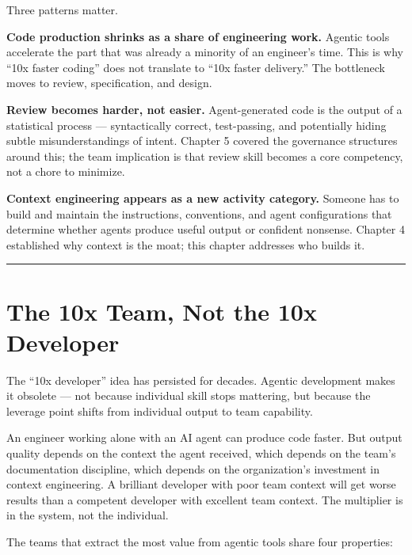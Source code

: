 \documentclass[
  a4paper,
  DIV=11,
  numbers=noendperiod]{scrreprt}
\begin{document}
Three patterns matter.

\textbf{Code production shrinks as a share of engineering work.} Agentic
tools accelerate the part that was already a minority of an engineer's
time. This is why ``10x faster coding'' does not translate to ``10x
faster delivery.'' The bottleneck moves to review, specification, and
design.

\textbf{Review becomes harder, not easier.} Agent-generated code is the
output of a statistical process --- syntactically correct, test-passing,
and potentially hiding subtle misunderstandings of intent. Chapter 5
covered the governance structures around this; the team implication is
that review skill becomes a core competency, not a chore to minimize.

\textbf{Context engineering appears as a new activity category.} Someone
has to build and maintain the instructions, conventions, and agent
configurations that determine whether agents produce useful output or
confident nonsense. Chapter 4 established why context is the moat; this
chapter addresses who builds it.

\begin{center}\rule{0.5\linewidth}{0.5pt}\end{center}

\section{The 10x Team, Not the 10x
Developer}\label{the-10x-team-not-the-10x-developer}

The ``10x developer'' idea has persisted for decades. Agentic
development makes it obsolete --- not because individual skill stops
mattering, but because the leverage point shifts from individual output
to team capability.

An engineer working alone with an AI agent can produce code faster. But
output quality depends on the context the agent received, which depends
on the team's documentation discipline, which depends on the
organization's investment in context engineering. A brilliant developer
with poor team context will get worse results than a competent developer
with excellent team context. The multiplier is in the system, not the
individual.

The teams that extract the most value from agentic tools share four
properties:
\end{document}
